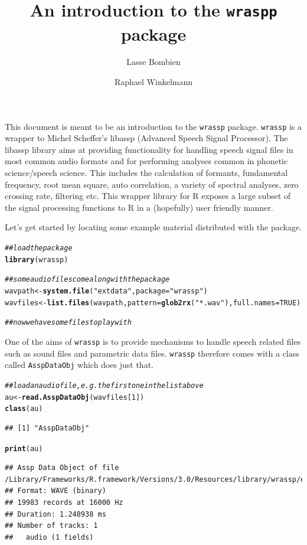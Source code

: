 \documentclass[11pt]{article}\usepackage[]{graphicx}\usepackage[]{color}
\title{An introduction to the \texttt{wraspp} package}
\author{Lasse Bombien \and Raphael Winkelmann}
\makeatletter
\newcommand{\hlstr}[1]{\textcolor[rgb]{0,0,0}{#1}}%
\newcommand{\hlcom}[1]{\textcolor[rgb]{0.4,0.4,0.4}{\textit{#1}}}%
\newcommand{\hlkwd}[1]{\textcolor[rgb]{0,0,0}{\textbf{#1}}}%
\newenvironment{kframe}{%
 \def\at@end@of@kframe{}%
 \ifinner\ifhmode%
  \def\at@end@of@kframe{\end{minipage}}%
  \begin{minipage}{\columnwidth}%
 \fi\fi%
 \def\FrameCommand##1{\hskip\@totalleftmargin \hskip-\fboxsep
 \colorbox{shadecolor}{##1}\hskip-\fboxsep
     \hskip-\linewidth \hskip-\@totalleftmargin \hskip\columnwidth}%
 \MakeFramed {\advance\hsize-\width
   \@totalleftmargin\z@ \linewidth\hsize
   \@setminipage}}%
 {\par\unskip\endMakeFramed%
 \at@end@of@kframe}
\newenvironment{knitrout}{}{} %
\makeatother
\begin{document}
\maketitle

This document is meant to be an introduction to the \verb|wrassp|
package. \verb|wrassp| is a wrapper to Michel Scheffer's libassp
(Advanced Speech Signal Processor). The libassp library aims at
providing functionality for handling speech signal files in most
common audio formats and for performing analyses common in phonetic
science/speech science. This includes the calculation of formants,
fundamental frequency, root mean square, auto correlation, a variety
of spectral analyses, zero crossing rate, filtering etc. This wrapper
library for R exposes a large subset of the signal processing
functions to R in a (hopefully) user friendly manner.  

Let's get started by locating some example material distributed with
the package.

\begin{knitrout}\footnotesize
{}\color{fgcolor}\begin{kframe}
\begin{alltt}
\hlcom{## load the package}
\hlkwd{library}(wrassp)

\hlcom{## some audio files come along with the package}
wavpath <- \hlkwd{system.file}(\hlstr{"extdata"}, package = \hlstr{"wrassp"})
wavfiles <- \hlkwd{list.files}(wavpath, pattern = \hlkwd{glob2rx}(\hlstr{"*.wav"}), full.names = TRUE)

\hlcom{## now we have some files to play with}
\end{alltt}
\end{kframe}
\end{knitrout}


One of the aims of \verb|wrassp| is to provide mechanisms to handle
speech related files such as sound files and parametric data
files. \verb|wrassp| therefore comes with a class called
\verb|AsspDataObj| which does just that. 

\begin{knitrout}\footnotesize
{}\color{fgcolor}\begin{kframe}
\begin{alltt}
\hlcom{## load an audio file, e.g. the first one in the list above}
au <- \hlkwd{read.AsspDataObj}(wavfiles[1])
\hlkwd{class}(au)
\end{alltt}
\begin{verbatim}
## [1] "AsspDataObj"
\end{verbatim}
\begin{alltt}
\hlkwd{print}(au)
\end{alltt}
\begin{verbatim}
## Assp Data Object of file /Library/Frameworks/R.framework/Versions/3.0/Resources/library/wrassp/extdata/lbo001.wav.
## Format: WAVE (binary)
## 19983 records at 16000 Hz
## Duration: 1.248938 ms
## Number of tracks: 1 
## 	 audio (1 fields)
\end{verbatim}
\end{kframe}
\end{knitrout}
\end{document}
